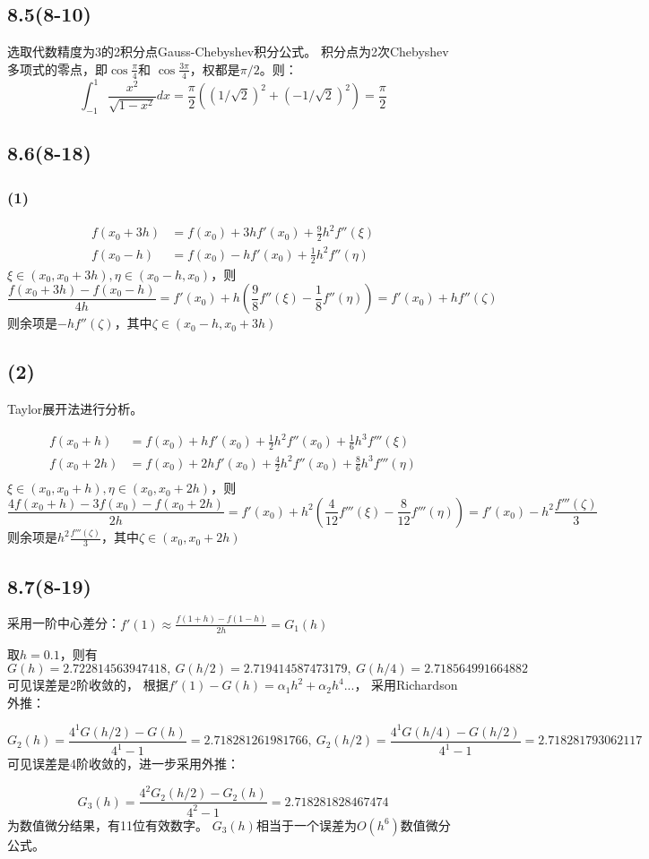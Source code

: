 \documentclass[UTF8,zihao=5]{ctexart}
\begin{document}
\subsection*{8.5(8-10)}
选取代数精度为3的2积分点Gauss-Chebyshev积分公式。
积分点为2次Chebyshev多项式的零点，即$\cos{\frac{\pi}{4}}$和
$\cos{\frac{3\pi}{4}}$，权都是$\pi/2$。则：
$$
\int_{-1}^1{\frac{x^2}{\sqrt{1-x^2}}dx}
=
\frac{\pi}{2}\left(
    (1/\sqrt{2})^2+(-1/\sqrt{2})^2
\right)
=\frac{\pi}{2}
$$

\subsection*{8.6(8-18)}

\subsubsection*{(1)}
$$
\begin{aligned}
    f(x_0+3h)&=f(x_0)+3hf'(x_0)+\frac{9}{2}h^2f''(\xi)\\
    f(x_0-h) &=f(x_0)-hf'(x_0)+\frac{1}{2}h^2f''(\eta)
\end{aligned}
$$
$\xi\in(x_0,x_0+3h),\eta\in(x_0-h,x_0)$，则
$$
\frac{f(x_0+3h)-f(x_0-h)}{4h}
=f'(x_0)+h\left(
    \frac{9}{8}f''(\xi)-\frac{1}{8}f''(\eta)
\right)
=f'(x_0)+hf''(\zeta)
$$
则余项是$-hf''(\zeta)$，其中$\zeta\in(x_0-h,x_0+3h)$

\subsection*{(2)}
Taylor展开法进行分析。

$$
\begin{aligned}
    f(x_0+h)&=f(x_0)+hf'(x_0)+\frac{1}{2}h^2f''(x_0)+\frac{1}{6}h^3f'''(\xi)\\
    f(x_0+2h)&=f(x_0)+2hf'(x_0)+\frac{4}{2}h^2f''(x_0)+\frac{8}{6}h^3f'''(\eta)\\
\end{aligned}
$$
$\xi\in(x_0,x_0+h),\eta\in(x_0,x_0+2h)$，则
$$
\frac{4f(x_0+h)-3f(x_0)-f(x_0+2h)}{2h}
=f'(x_0)+h^2\left(
    \frac{4}{12}f'''(\xi)-\frac{8}{12}f'''(\eta)
\right)
=f'(x_0)-h^2\frac{f'''(\zeta)}{3}
$$
则余项是$h^2\frac{f'''(\zeta)}{3}$，其中$\zeta\in(x_0,x_0+2h)$

\subsection*{8.7(8-19)}

采用一阶中心差分：$f'(1)\approx \frac{f(1+h)-f(1-h)}{2h}=G_1(h)$

取$h=0.1$，则有
$$
G(h)=2.722814563947418,\ 
G(h/2)=2.719414587473179,\ 
G(h/4)=2.718564991664882
$$
可见误差是2阶收敛的，
根据$f'(1) - G(h) = \alpha_1h^2 + \alpha_2h^4...$，
采用Richardson外推：

$$
G_2(h)=\frac{4^1G(h/2)-G(h)}{4^1-1}=2.718281261981766,\ 
G_2(h/2)=\frac{4^1G(h/4)-G(h/2)}{4^1-1}=2.718281793062117
$$
可见误差是4阶收敛的，进一步采用外推：

$$
G_3(h)=\frac{4^2G_2(h/2)-G_2(h)}{4^2-1}=2.718281828467474
$$
为数值微分结果，有11位有效数字。
$G_3(h)$相当于一个误差为$O(h^6)$数值微分公式。
\end{document}

